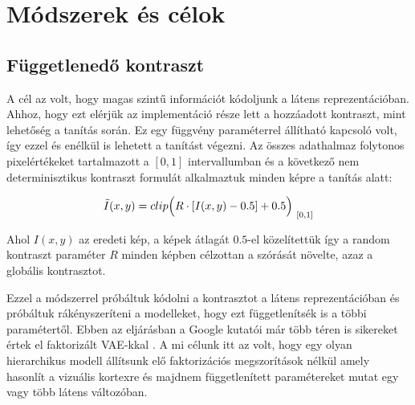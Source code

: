 \documentclass[12pt, english]{article}
\begin{document}
\newpage

\section{Módszerek és célok}

\vspace{7mm}

\subsection{Függetlenedő kontraszt}

\vspace{5mm}

\par A cél az volt, hogy magas szintű információt kódoljunk a látens reprezentációban. Ahhoz, hogy ezt elérjük az implementáció része lett a hozzáadott kontraszt, mint lehetőség a tanítás során. Ez egy függvény paraméterrel állítható kapcsoló volt, így ezzel és enélkül is lehetett a tanítást végezni. Az összes adathalmaz folytonos pixelértékeket tartalmazott a $[0, 1]$ intervallumban és a következő nem determinisztikus kontraszt formulát alkalmaztuk minden képre a tanítás alatt:

\vspace{4mm}

\begin{equation}
    \Tilde{I}(x, y) = clip\Big(R \cdot [I(x, y) - 0.5] + 0.5\Big)_{\ [0, 1]}
\end{equation}

\vspace{4mm}

\par Ahol $I(x, y)$ az eredeti kép, a képek átlagát $0.5$-el közelítettük így a random kontraszt paraméter $R$ minden képben célzottan a szórását növelte, azaz a globális kontrasztot.

\vspace{4mm}

\par Ezzel a módszerrel próbáltuk kódolni a kontrasztot a látens reprezentációban és próbáltuk rákényszeríteni a modelleket, hogy ezt függetlenítsék is a többi paramétertől. Ebben az eljárásban a Google kutatói már több téren is sikereket értek el faktorizált VAE-kkal \cite{locatello2018challenging}. A mi célunk itt az volt, hogy egy olyan hierarchikus modell állítsunk elő faktorizációs megszorítások nélkül amely hasonlít a vizuális kortexre és majdnem függetlenített paramétereket mutat egy vagy több látens változóban.
\end{document}
